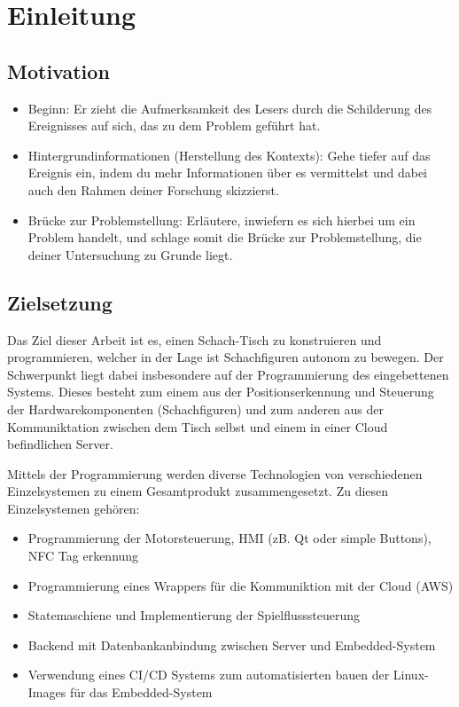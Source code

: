 

\hypertarget{einleitung}{%
\section{Einleitung}\label{einleitung}}

\hypertarget{motivation}{%
\subsection{Motivation}\label{motivation}}

\begin{itemize}
\tightlist
\item
  Beginn: Er zieht die Aufmerksamkeit des Lesers durch die Schilderung
  des Ereignisses auf sich, das zu dem Problem geführt hat.
\item
  Hintergrundinformationen (Herstellung des Kontexts): Gehe tiefer auf
  das Ereignis ein, indem du mehr Informationen über es vermittelst und
  dabei auch den Rahmen deiner Forschung skizzierst.
\item
  Brücke zur Problemstellung: Erläutere, inwiefern es sich hierbei um
  ein Problem handelt, und schlage somit die Brücke zur Problemstellung,
  die deiner Untersuchung zu Grunde liegt.
\end{itemize}

\hypertarget{zielsetzung}{%
\subsection{Zielsetzung}\label{zielsetzung}}

Das Ziel dieser Arbeit ist es, einen Schach-Tisch zu konstruieren und
programmieren, welcher in der Lage ist Schachfiguren autonom zu bewegen.
Der Schwerpunkt liegt dabei insbesondere auf der Programmierung des
eingebettenen Systems. Dieses besteht zum einem aus der
Positionserkennung und Steuerung der Hardwarekomponenten (Schachfiguren)
und zum anderen aus der Kommuniktation zwischen dem Tisch selbst und
einem in einer Cloud befindlichen Server.

Mittels der Programmierung werden diverse Technologien von verschiedenen
Einzelsystemen zu einem Gesamtprodukt zusammengesetzt. Zu diesen
Einzelsystemen gehören:

\begin{itemize}
\tightlist
\item
  Programmierung der Motorsteuerung, HMI (zB. Qt oder simple Buttons),
  NFC Tag erkennung
\item
  Programmierung eines Wrappers für die Kommuniktion mit der Cloud (AWS)
\item
  Statemaschiene und Implementierung der Spielflusssteuerung
\item
  Backend mit Datenbankanbindung zwischen Server und Embedded-System
\item
  Verwendung eines CI/CD Systems zum automatisierten bauen der
  Linux-Images für das Embedded-System
\end{itemize}


